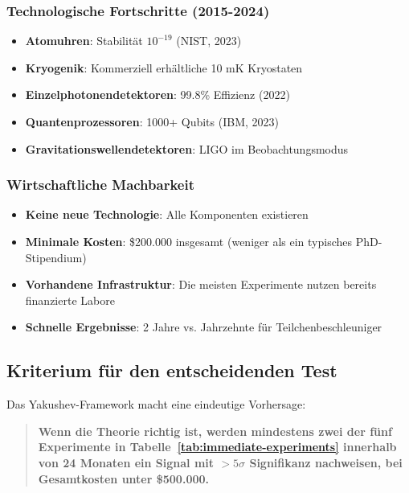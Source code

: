 \documentclass[11pt,a4paper]{article}
\begin{document}
	\subsubsection{Technologische Fortschritte (2015-2024)}
	
	\begin{itemize}
		\item \textbf{Atomuhren}: Stabilität $10^{-19}$ (NIST, 2023)
		\item \textbf{Kryogenik}: Kommerziell erhältliche 10 mK Kryostaten
		\item \textbf{Einzelphotonendetektoren}: 99.8\% Effizienz (2022)
		\item \textbf{Quantenprozessoren}: 1000+ Qubits (IBM, 2023)
		\item \textbf{Gravitationswellendetektoren}: LIGO im Beobachtungsmodus
	\end{itemize}
	
	\subsubsection{Wirtschaftliche Machbarkeit}
	
	\begin{itemize}
		\item \textbf{Keine neue Technologie}: Alle Komponenten existieren
		\item \textbf{Minimale Kosten}: \$200.000 insgesamt (weniger als ein typisches PhD-Stipendium)
		\item \textbf{Vorhandene Infrastruktur}: Die meisten Experimente nutzen bereits finanzierte Labore
		\item \textbf{Schnelle Ergebnisse}: 2 Jahre vs. Jahrzehnte für Teilchenbeschleuniger
	\end{itemize}
	
	\subsection{Kriterium für den entscheidenden Test}
	
	Das Yakushev-Framework macht eine eindeutige Vorhersage:
	
	\begin{quote}
		\textbf{Wenn die Theorie richtig ist, werden mindestens zwei der fünf Experimente in Tabelle~\ref{tab:immediate-experiments} innerhalb von 24 Monaten ein Signal mit $>5\sigma$ Signifikanz nachweisen, bei Gesamtkosten unter \$500.000.}
	\end{quote}
	
\end{document}
